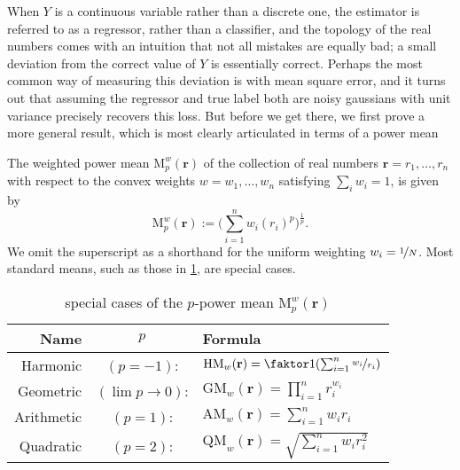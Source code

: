 \documentclass{article}
\theoremstyle{plain}
\theoremstyle{definition}
\begin{document}
When $Y$ is a continuous variable rather than a discrete one, the estimator is referred to as a regressor, rather than a classifier, and the topology of the real numbers comes with an intuition that not all mistakes are equally bad; a small deviation from the correct value of $Y$ is essentially correct. 
Perhaps the most common way of measuring this deviation is with mean square error, and it turns out that assuming the regressor and true label both are noisy gaussians with unit variance precisely recovers this loss. 
But before we get there, we first prove a more general result, which is most clearly articulated in terms of a power mean 

\begin{defn}%
	The weighted power mean $\mathrm M^w_p(\mathbf r)$ of the collection of real numbers $\mathbf r = r_1, \ldots, r_n$ with respect to the convex weights $w = w_1, \ldots, w_n$ satisfying $\sum_iw_i = 1$, is given by
	\[ \mathrm M^w_p(\mathbf r) := \Big(\sum_{i=1}^n w_i (r_i)^p \Big)^{\frac1p}.\]
	We omit the superscript as a shorthand for the uniform weighting $w_i = \nicefrac{1}{N}$.
	Most standard means, such as those in \cref{tab:power-means}, are special cases.
\end{defn}

\begin{table}
\centering
\renewcommand{\arraystretch}{1.5} %
\begin{tabular}{rcl}
	\textbf{Name} & $p$ & \textbf{Formula}\\\hline
	Harmonic&$(p=-1)$:& $\mathrm{HM}_w(\mathbf r) = \faktor1{\left(\sum_{i=1}^n \nicefrac{w_i}{r_i}\right)}$ \\
	Geometric&$(\lim {p\to 0})$:& $\mathrm{GM}_w(\mathbf r) = \prod_{i=1}^n r_i^{w_i}$ \\
	Arithmetic&$(p=1)$:& $\mathrm{AM}_w(\mathbf r) = \sum_{i=1}^n w_i r_i$ \\
	Quadratic&$(p=2)$:& $\mathrm{QM}_w(\mathbf r) = \sqrt{\textstyle\sum_{i=1}^n w_i r_i^2}$\\\hline
	\end{tabular}
	\caption{special cases of the $p$-power mean $\mathrm M_p^w(\mathbf r)$}
	\label{tab:power-means}
\end{table}
\end{document}
